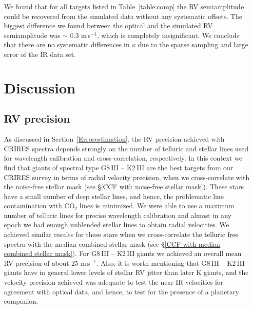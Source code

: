 \documentclass{aa}
\begin{document}
We found that for all targets listed in Table~\ref{table:comp} the RV
semiamplitude could be recovered from the simulated data without any systematic offsets.
The biggest difference  we found between the optical and the simulated RV
semiamplitude was $\sim$ 0.3 m\,s$^{-1}$, which is completely insignificant.
We conclude that there are no systematic differences in $\kappa$ due
to the sparse sampling and large error of the IR data set.


\section{Discussion}
\label{Results and Disc}


\subsection{RV precision}


As discussed in Section~\ref{Errorestimation}, the RV precision achieved with CRIRES spectra
depends strongly on the number of telluric and stellar lines used for wavelength calibration and cross-correlation, respectively.
In this context we find that giants of spectral type G8\,III -- K2\,III are the 
best targets from our CRIRES survey in terms of radial velocity precision, when we cross-correlate with the noise-free stellar mask
(see \S\ref{CCF with noise-free stellar mask}). These stars have a small number of deep stellar lines, and hence, 
the problematic line contamination with CO$_2$ lines is minimized. We were able to use a maximum number of telluric lines for precise 
wavelength calibration and almost in any epoch we had enough unblended stellar lines to obtain radial velocities.
We achieved similar results for these stars when we cross-correlate the telluric free spectra with the median-combined stellar mask
 (see \S\ref{CCF with median combined stellar mask}). 
For G8\,III -- K2\,III giants we achieved an overall mean RV precision of about 25 m\,s$^{-1}$.
Also, it is worth mentioning that G8\,III -- K2\,III giants have in general lower 
levels of stellar RV jitter than later K giants, and the velocity precision achieved was adequate to test 
the near-IR velocities for agreement with optical data, and hence, to test for the presence of a planetary companion.
\end{document}
